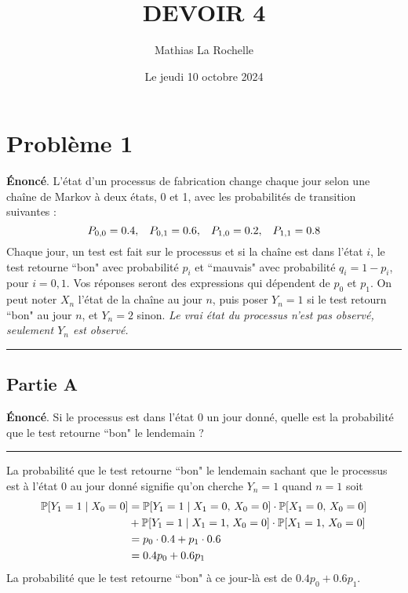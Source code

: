 \documentclass{article}
\title{\textbf{DEVOIR 4}}
\author{Mathias La Rochelle}
\date{Le jeudi 10 octobre 2024}
\begin{document}
\maketitle

\section*{Problème 1}
\textbf{Énoncé}. L'état d'un processus de fabrication change chaque jour 
selon une chaîne de Markov à deux états, 0 et 1, avec les probabilités de
transition suivantes :
\[
    P_{0,0} = 0.4,\hspace{.3cm} P_{0,1} = 0.6,\hspace{.3cm} P_{1,0} = 0.2,\hspace{.3cm} P_{1,1} = 0.8
\]
Chaque jour, un test est fait sur le processus et si la chaîne est dans
l'état $i$, le test retourne ``bon" avec probabilité $p_i$ et ``mauvais" avec
probabilité $q_i=1-p_i$, pour $i=0,1$. Vos réponses seront des expressions
qui dépendent de $p_0$ et $p_1$. On peut noter $X_n$ l'état de la chaîne 
au jour $n$, puis poser $Y_n=1$ si le test retourn ``bon" au jour $n$, et 
$Y_n=2$ sinon. \textit{Le vrai état du processus n'est pas observé, 
seulement $Y_n$ est observé.}
\vspace{.6cm}
\hrule
\vspace{.2cm}
\subsection*{Partie A}
\textbf{Énoncé}. Si le processus est dans l'état 0 un jour donné, quelle
est la probabilité que le test retourne ``bon" le lendemain ?
\vspace{.2cm}
\hrule
\vspace{.4cm}
La probabilité que le test retourne ``bon" le lendemain sachant que le 
processus est à l'état 0 au jour donné signifie qu'on cherche $Y_n=1$ 
quand $n=1$ soit
\begin{align}
    \mathbb{P}[Y_1=1\mid X_0=0]&=\mathbb{P}[Y_1=1\mid X_1=0,\,X_0=0]\cdot\mathbb{P}[X_1=0,\,X_0=0] \notag \\
    &+\mathbb{P}[Y_1=1\mid X_1=1,\,X_0=0]\cdot\mathbb{P}[X_1=1,\,X_0=0] \notag \\
    &=p_0\cdot 0.4+p_1\cdot 0.6 \notag \\
    &=0.4p_0+0.6p_1 \notag 
\end{align}
La probabilité que le test retourne ``bon" à ce jour-là est de $0.4p_0+0.6p_1$.
\end{document}
